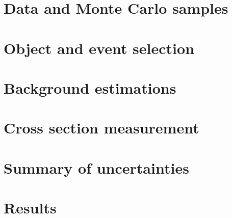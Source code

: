 \section{Data and Monte Carlo samples}\label{ssww13tev:data_mc}


\section{Object and event selection}\label{ssww13tev:object_event_selection}


%

\section{Background estimations}\label{ssww13tev:background}


\section{Cross section measurement}\label{ssww13tev:xsec}


\section{Summary of uncertainties}\label{ssww13tev:uncertainty}


\section{Results}\label{ssww13tev:results}

